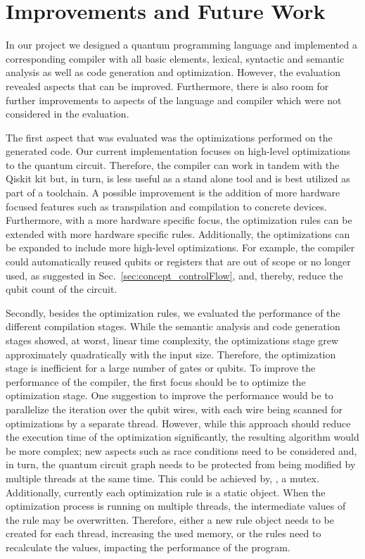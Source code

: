 \section{Improvements and Future Work}
In our project we designed a quantum programming language and implemented a corresponding compiler with all basic elements, lexical, syntactic and semantic analysis as well as code generation and optimization. However, the evaluation revealed aspects that can be improved. Furthermore, there is also room for further improvements to aspects of the language and compiler which were not considered in the evaluation.

The first aspect that was evaluated was the optimizations performed on the generated code. Our current implementation focuses on high-level optimizations to the quantum circuit. Therefore, the compiler can work in tandem with the Qiskit kit but, in turn, is less useful as a stand alone tool and is best utilized as part of a toolchain. A possible improvement is the addition of more hardware focused features such as transpilation and compilation to concrete devices. Furthermore, with a more hardware specific focus, the optimization rules can be extended with more hardware specific rules.   
Additionally, the optimizations can be expanded to include more high-level optimizations. For example, the compiler could automatically reused qubits or registers that are out of scope or no longer used, as suggested in Sec.~\ref{sec:concept_controlFlow}, and, thereby, reduce the qubit count of the circuit.  

Secondly, besides the optimization rules, we evaluated the performance of the different compilation stages. While the semantic analysis and code generation stages showed, at worst, linear time complexity, the optimizations stage grew approximately quadratically with the input size. Therefore, the optimization stage is inefficient for a large number of gates or qubits. To improve the performance of the compiler, the first focus should be to optimize the optimization stage. One suggestion to improve the performance would be to parallelize the iteration over the qubit wires, with each wire being scanned for optimizations by a separate thread. However, while this approach should reduce the execution time of the optimization significantly, the resulting algorithm would be more complex; new aspects such as race conditions need to be considered and, in turn, the quantum circuit graph needs to be protected from being modified by multiple threads at the same time. This could be achieved by, \eg, a mutex. Additionally, currently each optimization rule is a static object. When the optimization process is running on multiple threads, the intermediate values of the rule may be overwritten. Therefore, either a new rule object needs to be created for each thread, increasing the used memory, or the rules need to recalculate the values, impacting the performance of the program.   

